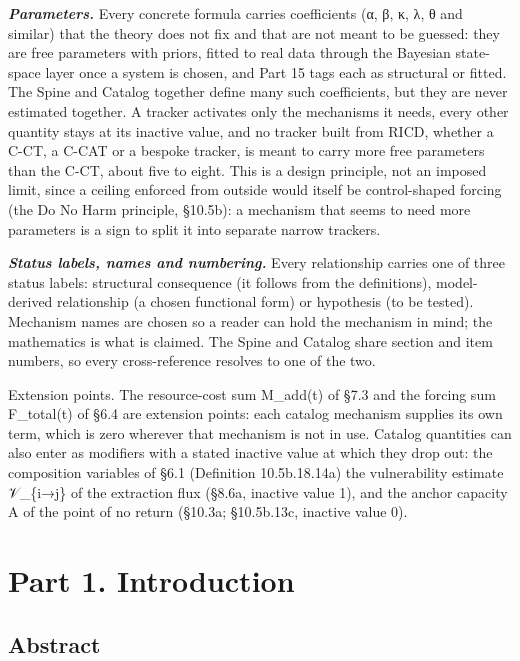 \documentclass[
]{article}
\begin{document}
\emph{\textbf{Parameters.}} Every concrete formula carries coefficients
(α, β, κ, λ, θ and similar) that the theory does not fix and that are
not meant to be guessed: they are free parameters with priors, fitted to
real data through the Bayesian state-space layer once a system is
chosen, and Part 15 tags each as structural or fitted. The Spine and
Catalog together define many such coefficients, but they are never
estimated together. A tracker activates only the mechanisms it needs,
every other quantity stays at its inactive value, and no tracker built
from RICD, whether a C-CT, a C-CAT or a bespoke tracker, is meant to
carry more free parameters than the C-CT, about five to eight. This is a
design principle, not an imposed limit, since a ceiling enforced from
outside would itself be control-shaped forcing (the Do No Harm
principle, §10.5b): a mechanism that seems to need more parameters is a
sign to split it into separate narrow trackers.

\emph{\textbf{Status labels, names and numbering.}} Every relationship
carries one of three status labels: structural consequence (it follows
from the definitions), model-derived relationship (a chosen functional
form) or hypothesis (to be tested). Mechanism names are chosen so a
reader can hold the mechanism in mind; the mathematics is what is
claimed. The Spine and Catalog share section and item numbers, so every
cross-reference resolves to one of the two.

Extension points. The resource-cost sum M\_add(t) of §7.3 and the
forcing sum F\_total(t) of §6.4 are extension points: each catalog
mechanism supplies its own term, which is zero wherever that mechanism
is not in use. Catalog quantities can also enter as modifiers with a
stated inactive value at which they drop out: the composition variables
of §6.1 (Definition 10.5b.18.14a) the vulnerability estimate 𝒱\_\{i→j\}
of the extraction flux (§8.6a, inactive value 1), and the anchor
capacity A of the point of no return (§10.3a; §10.5b.13c, inactive value
0).

\hypertarget{part-1.-introduction}{%
\section{Part 1. Introduction}\label{part-1.-introduction}}

\hypertarget{abstract}{%
\subsection{Abstract}\label{abstract}}
\end{document}
